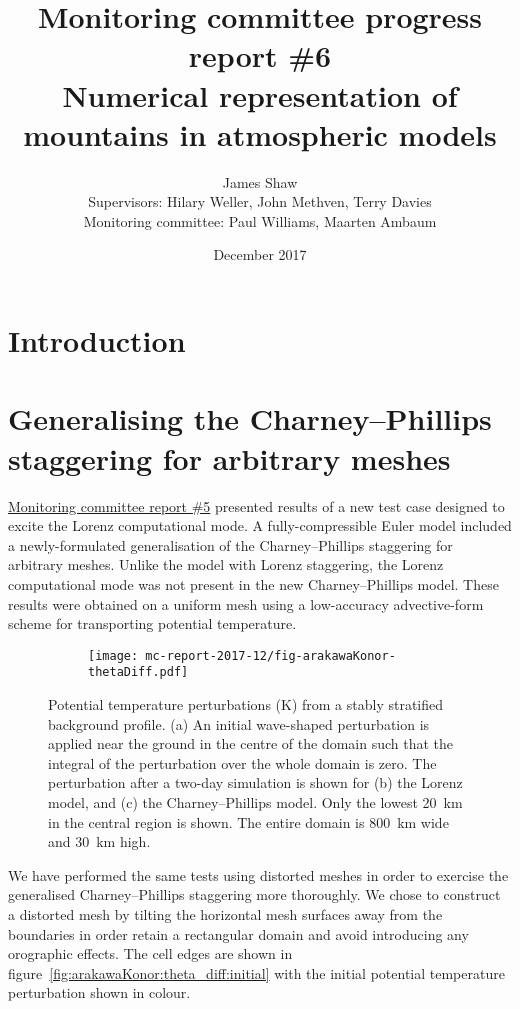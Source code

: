 \documentclass[a4paper,11pt]{article}
\title{
\vspace*{-2em}
Monitoring committee progress report \#6\\
\vspace*{1em}
\Large{Numerical representation of mountains in atmospheric models}}
\author{James Shaw
\vspace{0.5em} \\
\large{Supervisors: Hilary Weller, John Methven, Terry Davies}
\vspace{0.5em} \\
\large{Monitoring committee: Paul Williams, Maarten Ambaum}}
\date{December 2017}
\begin{document}
\maketitle

\section{Introduction}

\section{Generalising the Charney--Phillips staggering for arbitrary meshes}

\href{http://www.datumedge.co.uk/publications/mc-report-2017-06.pdf}{Monitoring committee report \#5} presented results of a new test case designed to excite the Lorenz computational mode.
A fully-compressible Euler model included a newly-formulated generalisation of the Charney--Phillips staggering for arbitrary meshes.
Unlike the model with Lorenz staggering, the Lorenz computational mode was not present in the new Charney--Phillips model.
These results were obtained on a uniform mesh using a low-accuracy advective-form scheme for transporting potential temperature.

\begin{figure}
	\centering
	\begin{subfigure}{\textwidth}
		\label{fig:arakawaKonor:theta_diff:initial}
		\label{fig:arakawaKonor:theta_diff:lorenz}
		\label{fig:arakawaKonor:theta_diff:cp}
		\texttt{[image: mc-report-2017-12/fig-arakawaKonor-thetaDiff.pdf]}
	\end{subfigure}
	\caption{Potential temperature perturbations (\si{\kelvin}) from a stably stratified background profile.
	(a) An initial wave-shaped perturbation is applied near the ground in the centre of the domain such that the integral of the perturbation over the whole domain is zero.
	The perturbation after a two-day simulation is shown for (b) the Lorenz model, and (c) the Charney--Phillips model.
	Only the lowest \SI{20}{\kilo\meter} in the central region is shown.  The entire domain is \SI{800}{\kilo\meter} wide and \SI{30}{\kilo\meter} high.
	}
	\label{fig:arakawaKonor:theta_diff}
\end{figure}

We have performed the same tests using distorted meshes in order to exercise the generalised Charney--Phillips staggering more thoroughly.
We chose to construct a distorted mesh by tilting the horizontal mesh surfaces away from the boundaries in order retain a rectangular domain and avoid introducing any orographic effects.
The cell edges are shown in figure~\ref{fig:arakawaKonor:theta_diff:initial} with the initial potential temperature perturbation shown in colour.
\end{document}
